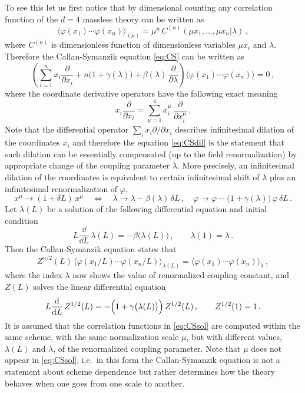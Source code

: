 To see this let us first notice that by dimensional counting any correlation
function of the $d=4$ massless theory can be written as
\[
\bigl\langle\varphi(x_1)\cdots\varphi(x_n)\bigr\rangle_{(\mu)}=\mu^n\,C^{(n)}(\mu x_1,\dots,\mu x_n|\lambda)\,,
\]
where $C^{(n)}$ is dimensionless function of dimensionless variables $\mu x_i$
and $\lambda$. Therefore the Callan-Symanzik equation \eqref{eq:CS} can be written
as
\begin{equation}\label{eq:CSdil}
\left(\sum_{i=1}^nx_i\frac\partial{\partial x_i}+n\bigl(1+\gamma(\lambda)\bigr)+\beta(\lambda)\,\frac\partial{\partial\lambda}\right)\bigl\langle\varphi(x_1)\cdots\varphi(x_n)\bigr\rangle=0\,,
\end{equation}
where the coordinate derivative operators have the following exact meaning
\[
x_i\frac\partial{\partial x_i}=\sum_{\mu=1}^4x_i^\mu\,\frac\partial{\partial x_i^\mu}\,.
\]
Note that the differential operator $\sum_ix_i\partial/\partial x_i$ describes
infinitesimal dilation of the coordinates $x_i$ and therefore the equation
\eqref{eq:CSdil} is the statement that such dilation can be essentially
compensated (up to the field renormalization) by appropriate change of the
coupling parameter $\lambda$. More precisely, an infinitesimal dilation of the
coordinates is equivalent to certain infinitesimal shift of $\lambda$ plus an
infinitesimal renormalization of $\varphi$,
\[
x^\mu\to(1+\delta L)\,x^\mu\quad\Longleftrightarrow\quad
\lambda\to\lambda-\beta(\lambda)\,\delta L\,,\quad\varphi\to\varphi-\bigl(1+\gamma(\lambda)\bigr)\,\varphi\,\delta L\,.
\]
Let $\lambda(L)$ be a solution of the following differential equation and initial
condition
\begin{equation}\label{eq:flow1}
L\frac{\dd}{\dd L}\,\lambda(L)=-\beta\bigl(\lambda(L)\bigr)\,,\qquad\lambda(1)=\lambda\,.
\end{equation}
Then the Callan-Symanzik equation states that
\begin{equation}\label{eq:CSsol}
Z^{n/2}(L)\,\bigl\langle\varphi(x_1/L)\cdots\varphi(x_n/L)\bigr\rangle_{\lambda(L)}=\bigl\langle\varphi(x_1)\cdots\varphi(x_n)\bigr\rangle_\lambda\,,
\end{equation}
where the index $\lambda$ now shows the value of renormalized coupling constant,
and $Z(L)$ solves the linear differential equation
\begin{equation}\label{eq:ZL}
L\frac{\mathop{}\!\mathrm{d}}{\mathop{}\!\mathrm{d} L}\,Z^{1/2}(L)=-\Bigl(1+\gamma\bigl(\lambda(L)\bigr)\Bigr)\,Z^{1/2}(L)\,,\qquad Z^{1/2}(1)=1\,.
\end{equation}
It is assumed that the correlation functions in \eqref{eq:CSsol} are computed
within the same scheme, with the same normalization scale $\mu$, but with
different values, $\lambda(L)$ and $\lambda$, of the renormalized coupling
parameter. Note that $\mu$ does not appear in \eqref{eq:CSsol}, i.e.\ in this form
the Callan-Symanzik equation is not a statement about scheme dependence but
rather determines how the theory behaves when one goes from one scale to
another.

